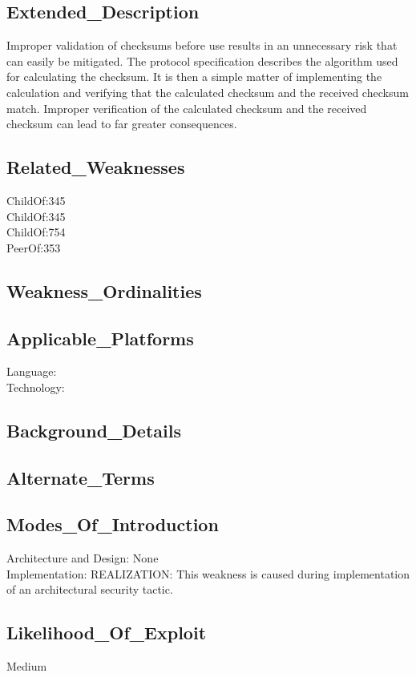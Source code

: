 \subsection*{Extended\_Description}
Improper validation of checksums before use results in an unnecessary risk that can easily be mitigated. The protocol specification describes the algorithm used for calculating the checksum. It is then a simple matter of implementing the calculation and verifying that the calculated checksum and the received checksum match. Improper verification of the calculated checksum and the received checksum can lead to far greater consequences.

\subsection*{Related\_Weaknesses}
ChildOf:345\\
ChildOf:345\\
ChildOf:754\\
PeerOf:353\\
\subsection*{Weakness\_Ordinalities}
\subsection*{Applicable\_Platforms}
Language: \\
Technology: \\
\subsection*{Background\_Details}
\subsection*{Alternate\_Terms}
\subsection*{Modes\_Of\_Introduction}
Architecture and Design: None\\
Implementation: REALIZATION: This weakness is caused during implementation of an architectural security tactic.\\
\subsection*{Likelihood\_Of\_Exploit}
Medium

